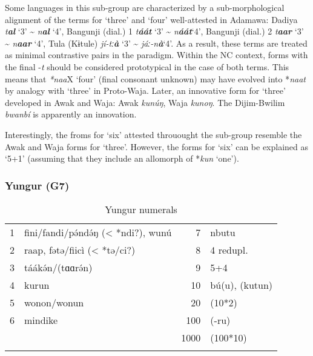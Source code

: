 Some languages in this sub-group are characterized by a sub-morphological alignment of the terms for ‘three’ and ‘four’ well-attested in Adamawa: Dadiya \textit{t}\textbf{\textit{al} }‘3’ {\textasciitilde} \textit{n}\textbf{\textit{al}} ‘4’, Bangunji (dial.) 1 \textit{t}\textbf{\textit{áát}} ‘3’ {\textasciitilde} \textit{n}\textbf{\textit{áát}}‘4’, Bangunji (dial.) 2 \textit{t}\textbf{\textit{aar}} ‘3’ {\textasciitilde} \textit{n}\textbf{\textit{aar}} ‘4’, Tula (Kɨtule) \textit{jí-tː}\textbf{\textit{à}} ‘3’ {\textasciitilde} \textit{jáː-n}\textbf{\textit{à}}‘4’. As a result, these terms are treated as minimal contrastive pairs in the paradigm.  Within the NC context, forms with the final -\textit{t} should be considered prototypical in the case of both terms. This means that \textit{*naa}X ‘four’ (final consonant unknown) may have evolved into *\textit{naat} by analogy with ‘three’ in Proto-Waja. Later, an innovative form for ‘three’ developed in Awak and Waja: Awak \textit{kunúŋ}, Waja \textit{kunoŋ}. The Dijim-Bwilim \textit{bwanbí} is apparently an innovation. 

Interestingly, the froms for ‘six’ attested throuought the sub-group resemble the Awak and Waja forms for ‘three’. However, the forms for ‘six’ can be explained as ‘5+1’ (assuming that they include an allomorph of *\textit{kun} ‘one’).

\subsubsection{Yungur (G7)}%
\begin{table}
\caption{\label{tab:3:115}Yungur numerals}


\begin{tabularx}{\textwidth}{llrX}
\lsptoprule

1 & fini/fandi/p{\'{ə}}nd{\'{ə}}ŋ (< *ndi?), wunú & 7 & nbutu\\
2 & raap, fətə/fiicì (< *tə/ci?) & 8 & 4 redupl.\\
3 & táák{\'{ə}}n/(tɑɑr{\'{ə}}n) & 9 & 5+4\\
4 & kurun & 10 & bú(u), (kutun)\\
5 & wonon/wonun & 20 & (10*2)\\
6 & mindike & 100 & (-ru)\\
&  & 1000 & (100*10)\\
\lspbottomrule
\end{tabularx}
\end{table}

